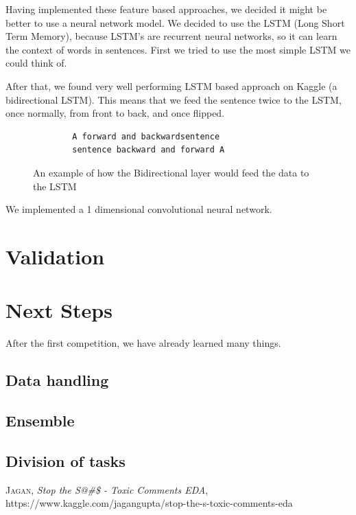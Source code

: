 \documentclass[10pt, a4paper,twocolumn]{article}
\begin{document}
	Having implemented these feature based approaches, we decided it might be better to use a neural network model. We decided to use the LSTM (Long Short Term Memory), because LSTM's are recurrent neural networks, so it can learn the context of words in sentences. First we tried to use the most simple LSTM we could think of.
	
	
	After that, we found  very well performing LSTM based approach on Kaggle (a bidirectional LSTM). This means that we feed the sentence twice to the LSTM, once normally, from front to back, and once flipped.
	\begin{figure}
	\begin{verbatim}	
	    A forward and backwardsentence
	    sentence backward and forward A
	\end{verbatim}
	\caption{An example of how the  Bidirectional layer would feed the data to the LSTM}
	\end{figure}
	
	
	We implemented a 1 dimensional convolutional neural network.
	
	

	
	\section{Validation}
	
	
	\section{Next Steps}
	After the first competition, we have already learned many things. 
	
	\subsection{Data handling}
	
	\subsection{Ensemble}
	
	\subsection{Division of tasks}
	
	
	\begin{thebibliography}{xx}
		\textsc{Jagan}, \textit{Stop the S@\#\$ - Toxic Comments EDA},
		 https://www.kaggle.com/jagangupta/stop-the-s-toxic-comments-eda
		
			
		
	\end{thebibliography}
	
\end{document}
